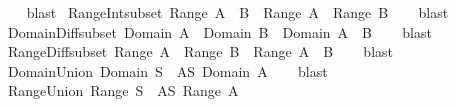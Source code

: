 \begin{isabellebody}
%
\isadelimproof
\ \ %
\endisadelimproof
%
\isatagproof
{}\isamarkupfalse%
\ blast%
\endisatagproof
{\isafoldproof}%
%
\isadelimproof
\isanewline
%
\endisadelimproof
\isanewline
{}\isamarkupfalse%
\ Range{\isacharunderscore}{\kern0pt}Int{\isacharunderscore}{\kern0pt}subset{\isacharcolon}{\kern0pt}\ {\isachardoublequoteopen}Range\ {\isacharparenleft}{\kern0pt}A\ {\isasyminter}\ B{\isacharparenright}{\kern0pt}\ {\isasymsubseteq}\ Range\ A\ {\isasyminter}\ Range\ B{\isachardoublequoteclose}\isanewline
%
\isadelimproof
\ \ %
\endisadelimproof
%
\isatagproof
{}\isamarkupfalse%
\ blast%
\endisatagproof
{\isafoldproof}%
%
\isadelimproof
\isanewline
%
\endisadelimproof
\isanewline
{}\isamarkupfalse%
\ Domain{\isacharunderscore}{\kern0pt}Diff{\isacharunderscore}{\kern0pt}subset{\isacharcolon}{\kern0pt}\ {\isachardoublequoteopen}Domain\ A\ {\isacharminus}{\kern0pt}\ Domain\ B\ {\isasymsubseteq}\ Domain\ {\isacharparenleft}{\kern0pt}A\ {\isacharminus}{\kern0pt}\ B{\isacharparenright}{\kern0pt}{\isachardoublequoteclose}\isanewline
%
\isadelimproof
\ \ %
\endisadelimproof
%
\isatagproof
{}\isamarkupfalse%
\ blast%
\endisatagproof
{\isafoldproof}%
%
\isadelimproof
\isanewline
%
\endisadelimproof
\isanewline
{}\isamarkupfalse%
\ Range{\isacharunderscore}{\kern0pt}Diff{\isacharunderscore}{\kern0pt}subset{\isacharcolon}{\kern0pt}\ {\isachardoublequoteopen}Range\ A\ {\isacharminus}{\kern0pt}\ Range\ B\ {\isasymsubseteq}\ Range\ {\isacharparenleft}{\kern0pt}A\ {\isacharminus}{\kern0pt}\ B{\isacharparenright}{\kern0pt}{\isachardoublequoteclose}\isanewline
%
\isadelimproof
\ \ %
\endisadelimproof
%
\isatagproof
{}\isamarkupfalse%
\ blast%
\endisatagproof
{\isafoldproof}%
%
\isadelimproof
\isanewline
%
\endisadelimproof
\isanewline
{}\isamarkupfalse%
\ Domain{\isacharunderscore}{\kern0pt}Union{\isacharcolon}{\kern0pt}\ {\isachardoublequoteopen}Domain\ {\isacharparenleft}{\kern0pt}{\isasymUnion}S{\isacharparenright}{\kern0pt}\ {\isacharequal}{\kern0pt}\ {\isacharparenleft}{\kern0pt}{\isasymUnion}A{\isasymin}S{\isachardot}{\kern0pt}\ Domain\ A{\isacharparenright}{\kern0pt}{\isachardoublequoteclose}\isanewline
%
\isadelimproof
\ \ %
\endisadelimproof
%
\isatagproof
{}\isamarkupfalse%
\ blast%
\endisatagproof
{\isafoldproof}%
%
\isadelimproof
\isanewline
%
\endisadelimproof
\isanewline
{}\isamarkupfalse%
\ Range{\isacharunderscore}{\kern0pt}Union{\isacharcolon}{\kern0pt}\ {\isachardoublequoteopen}Range\ {\isacharparenleft}{\kern0pt}{\isasymUnion}S{\isacharparenright}{\kern0pt}\ {\isacharequal}{\kern0pt}\ {\isacharparenleft}{\kern0pt}{\isasymUnion}A{\isasymin}S{\isachardot}{\kern0pt}\ Range\ A{\isacharparenright}{\kern0pt}{\isachardoublequoteclose}\isanewline

\end{isabellebody}
